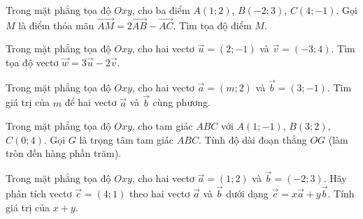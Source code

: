 \begin{bt}%
Trong mặt phẳng tọa độ $Oxy$, cho ba điểm $A(1;2)$, $B(-2;3)$, $C(4;-1)$. Gọi $M$ là điểm thỏa mãn $\overrightarrow{AM}=2\overrightarrow{AB}-\overrightarrow{AC}$. Tìm tọa độ điểm $M$.
\end{bt}

\begin{bt}%
Trong mặt phẳng tọa độ $Oxy$, cho hai vectơ $\vec{u}=(2;-1)$ và $\vec{v}=(-3;4)$. Tìm tọa độ vectơ $\vec{w}=3\vec{u}-2\vec{v}$.
\end{bt}

\begin{bt}%
Trong mặt phẳng tọa độ $Oxy$, cho hai vectơ $\vec{a}=(m;2)$ và $\vec{b}=(3;-1)$. Tìm giá trị của $m$ để hai vectơ $\vec{a}$ và $\vec{b}$ cùng phương.
\end{bt}

\begin{bt}%
Trong mặt phẳng tọa độ $Oxy$, cho tam giác $ABC$ với $A(1;-1)$, $B(3;2)$, $C(0;4)$. Gọi $G$ là trọng tâm tam giác $ABC$. Tính độ dài đoạn thẳng $OG$ (làm tròn đến hàng phần trăm).
\end{bt}

\begin{bt}%
Trong mặt phẳng tọa độ $Oxy$, cho hai vectơ $\vec{a}=(1;2)$ và $\vec{b}=(-2;3)$. Hãy phân tích vectơ $\vec{c}=(4;1)$ theo hai vectơ $\vec{a}$ và $\vec{b}$ dưới dạng $\vec{c}=x\vec{a}+y\vec{b}$. Tính giá trị của $x+y$.
\end{bt}

